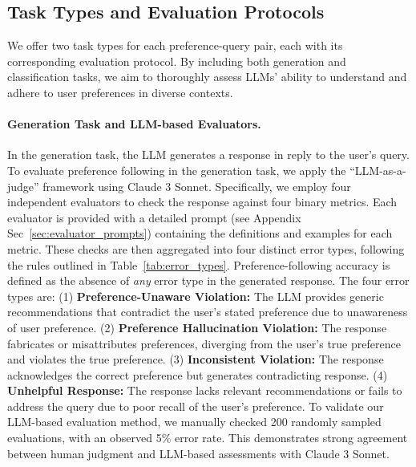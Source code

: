 \vspace{-2mm}
\subsection{Task Types and Evaluation Protocols}
We offer two task types for each preference-query pair, each with its corresponding evaluation protocol. By including both generation and classification tasks, we aim to thoroughly assess LLMs' ability to understand and adhere to user preferences in diverse contexts.

\paragraph{Generation Task and LLM-based Evaluators.}
\label{sec:method_errortypes}
In the generation task, the LLM generates a response in reply to the user’s query. To evaluate preference following in the generation task, we apply the ``LLM-as-a-judge'' framework using Claude 3 Sonnet. Specifically, we employ four independent evaluators to check the response against four binary metrics. Each evaluator is provided with a detailed prompt (see Appendix Sec~\ref{sec:evaluator_prompts}) containing the definitions and examples for each metric. These checks are then aggregated into four distinct error types, following the rules outlined in Table~\ref{tab:error_types}. Preference-following accuracy is defined as the absence of {\it any} error type in the generated response. The four error types are: (1) \textbf{Preference-Unaware Violation:} The LLM provides generic recommendations that contradict the user’s stated preference due to unawareness of user preference.
(2) \textbf{Preference Hallucination Violation:} The response fabricates or misattributes preferences, diverging from the user’s true preference and violates the true preference.
(3) \textbf{Inconsistent Violation:} The response acknowledges the correct preference but generates contradicting response. 
(4) \textbf{Unhelpful Response:} The response lacks relevant recommendations or fails to address the query due to poor recall of the user’s preference. 
To validate our LLM-based evaluation method, we manually checked 200 randomly sampled evaluations, with an observed 5\% error rate. This demonstrates strong agreement between human judgment and LLM-based assessments with Claude 3 Sonnet.
